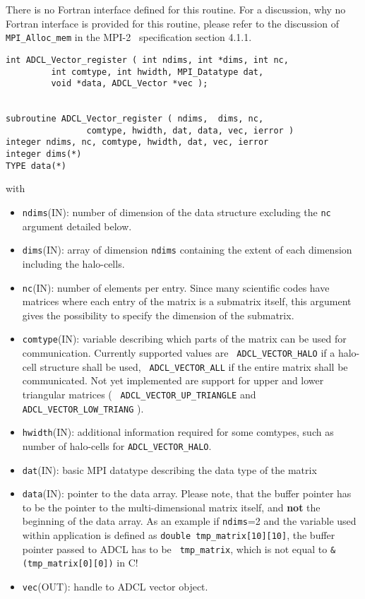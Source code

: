 There is no Fortran interface defined for this routine. For a discussion, why
no Fortran interface is provided for this routine, please refer to the
discussion of {\tt MPI\_Alloc\_mem} in the MPI-2~\cite{mpi2} specification
section 4.1.1.

\hspace{1cm}
\begin{verbatim}
int ADCL_Vector_register ( int ndims, int *dims, int nc, 
         int comtype, int hwidth, MPI_Datatype dat,
         void *data, ADCL_Vector *vec );


subroutine ADCL_Vector_register ( ndims,  dims, nc, 
                comtype, hwidth, dat, data, vec, ierror )
integer ndims, nc, comtype, hwidth, dat, vec, ierror
integer dims(*)
TYPE data(*)
\end{verbatim}
with
\begin{itemize}
\item {\tt ndims}(IN): number of dimension of the data structure excluding the
  {\tt nc} argument detailed below.
\item {\tt dims}(IN): array of dimension {\tt ndims} containing the extent of
  each dimension including the halo-cells.
\item {\tt nc}(IN): number of elements per entry. Since many scientific codes
  have matrices where each entry of the matrix is a submatrix itself, this
  argument gives the possibility to specify the dimension of the submatrix.
\item {\tt comtype}(IN): variable describing which parts of the matrix can be
  used for communication. Currently supported values are {\tt
    ADCL\_VECTOR\_HALO} if a halo-cell structure shall be used, {\tt
    ADCL\_VECTOR\_ALL} if the entire matrix shall be communicated. Not yet
  implemented are support for upper and lower triangular matrices ( {\tt
    ADCL\_VECTOR\_UP\_TRIANGLE} and {\tt ADCL\_VECTOR\_LOW\_TRIANG} ).
\item {\tt hwidth}(IN): additional information required for some comtypes,
  such as number of halo-cells for {\tt ADCL\_VECTOR\_HALO}.
\item {\tt dat}(IN): basic MPI datatype describing the data type of the matrix
\item {\tt data}(IN): pointer to the data array. Please note, that the buffer
  pointer has to be the pointer to the multi-dimensional matrix itself, and
  {\bf not} the beginning of the data array. As an example if {\tt ndims}=2
  and the variable used within application is defined as {\tt double
    tmp\_matrix[10][10]}, the buffer pointer passed to ADCL has to be {\tt
    tmp\_matrix}, which is not equal to {\tt \&(tmp\_matrix[0][0])} in C!
\item {\tt vec}(OUT): handle to ADCL vector object.
\end{itemize}

